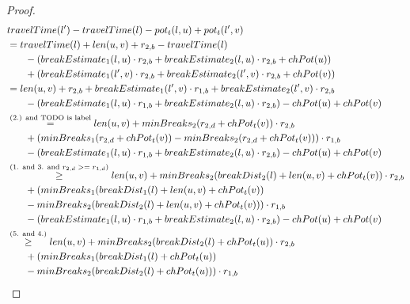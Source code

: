 \begin{proof}
	\begin{align}
		\begin{split}\label{eq:label_n_feasibility_proof_3}
			&\concretett(l') - \concretett(l) - \concretepotential_t(l,u) + \concretepotential_t(l',v)\\
			&= \concretett(l) + \len(u,v) + r_{2,b} - \concretett(l)\\
			& \phantom{{}=1} - (\breakEstimate_1(l,u) \cdot \restr_{2,b} + \breakEstimate_2(l,u) \cdot \restr_{2,b} + \chpotential(u))\\
			& \phantom{{}=1} + (\breakEstimate_1(l',v) \cdot \restr_{2,b} + \breakEstimate_2(l',v) \cdot \restr_{2,b} + \chpotential(v))\\
			&= \len(u,v) + r_{2,b} + \breakEstimate_1(l',v) \cdot \restr_{1,b} + \breakEstimate_2(l',v) \cdot \restr_{2,b} \\
			& \phantom{{}=1} - (\breakEstimate_1(l,u) \cdot \restr_{1,b} + \breakEstimate_2(l,u) \cdot \restr_{2,b}) - \chpotential(u) + \chpotential(v)\\
			&\stackrel{\text{(2.) and TODO is label}}{=} \len(u,v) + \minBreaks_2(\restr_{2,d} + \chpotential_t(v)) \cdot \restr_{2,b}\\
			& \phantom{{}=1} + (\minBreaks_1(\restr_{2,d} + \chpotential_t(v)) - \minBreaks_{2}(\restr_{2,d} + \chpotential_t(v))) \cdot \restr_{1,b} \\
			& \phantom{{}=1} - (\breakEstimate_1(l,u) \cdot \restr_{1,b} + \breakEstimate_2(l,u) \cdot \restr_{2,b}) - \chpotential(u) + \chpotential(v)\\
			&\stackrel{\text{(1. and 3. and $\restr_{2,d} >= \restr_{1,d}$)}}{\ge} \len(u,v) + \minBreaks_2(\breakDist_2(l) + \len(u,v) + \chpotential_t(v)) \cdot \restr_{2,b}\\
			& \phantom{{}=1} + (\minBreaks_1(\breakDist_1(l) + \len(u,v) + \chpotential_t(v))\\
			& \phantom{{}=1} - \minBreaks_{2}(\breakDist_2(l) + \len(u,v) +\chpotential_t(v))) \cdot \restr_{1,b} \\
			& \phantom{{}=1} - (\breakEstimate_1(l,u) \cdot \restr_{1,b} + \breakEstimate_2(l,u) \cdot \restr_{2,b}) - \chpotential(u) + \chpotential(v)\\
			&\stackrel{\text{(5. and 4.)}}{\ge} \len(u,v) + \minBreaks_2(\breakDist_2(l) + \chpotential_t(u)) \cdot \restr_{2,b}\\
			& \phantom{{}=1} + (\minBreaks_1(\breakDist_1(l) + \chpotential_t(u))\\
			& \phantom{{}=1} - \minBreaks_{2}(\breakDist_{2}(l) + \chpotential_t(u))) \cdot \restr_{1,b} \\

\end{split}
\end{align}
\end{proof}
